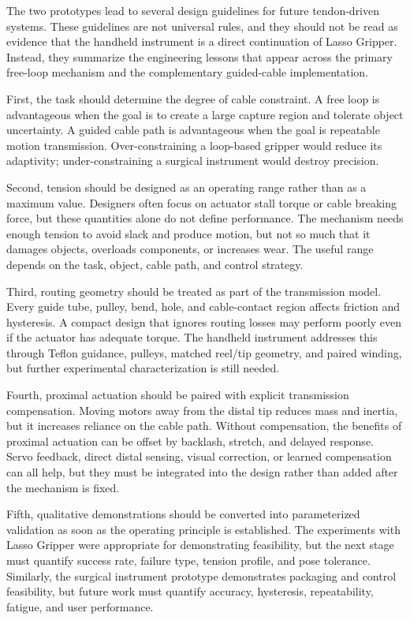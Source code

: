 The two prototypes lead to several design guidelines for future tendon-driven systems. These guidelines are not universal rules, and they should not be read as evidence that the handheld instrument is a direct continuation of Lasso Gripper. Instead, they summarize the engineering lessons that appear across the primary free-loop mechanism and the complementary guided-cable implementation.

First, the task should determine the degree of cable constraint. A free loop is advantageous when the goal is to create a large capture region and tolerate object uncertainty. A guided cable path is advantageous when the goal is repeatable motion transmission. Over-constraining a loop-based gripper would reduce its adaptivity; under-constraining a surgical instrument would destroy precision.

Second, tension should be designed as an operating range rather than as a maximum value. Designers often focus on actuator stall torque or cable breaking force, but these quantities alone do not define performance. The mechanism needs enough tension to avoid slack and produce motion, but not so much that it damages objects, overloads components, or increases wear. The useful range depends on the task, object, cable path, and control strategy.

Third, routing geometry should be treated as part of the transmission model. Every guide tube, pulley, bend, hole, and cable-contact region affects friction and hysteresis. A compact design that ignores routing losses may perform poorly even if the actuator has adequate torque. The handheld instrument addresses this through Teflon guidance, pulleys, matched reel/tip geometry, and paired winding, but further experimental characterization is still needed.

Fourth, proximal actuation should be paired with explicit transmission compensation. Moving motors away from the distal tip reduces mass and inertia, but it increases reliance on the cable path. Without compensation, the benefits of proximal actuation can be offset by backlash, stretch, and delayed response. Servo feedback, direct distal sensing, visual correction, or learned compensation can all help, but they must be integrated into the design rather than added after the mechanism is fixed.

Fifth, qualitative demonstrations should be converted into parameterized validation as soon as the operating principle is established. The experiments with Lasso Gripper were appropriate for demonstrating feasibility, but the next stage must quantify success rate, failure type, tension profile, and pose tolerance. Similarly, the surgical instrument prototype demonstrates packaging and control feasibility, but future work must quantify accuracy, hysteresis, repeatability, fatigue, and user performance.

